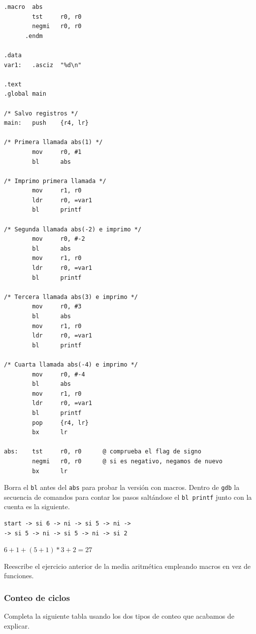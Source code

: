 \begin{lstlisting}[caption={Parte de subrut8.s},label={lst:codigoPract3_9}]
      .macro  abs
        tst     r0, r0
        negmi   r0, r0
      .endm

.data
var1:   .asciz  "%d\n"

.text
.global main

/* Salvo registros */
main:   push    {r4, lr}

/* Primera llamada abs(1) */
        mov     r0, #1
        bl      abs

/* Imprimo primera llamada */
        mov     r1, r0
        ldr     r0, =var1
        bl      printf

/* Segunda llamada abs(-2) e imprimo */
        mov     r0, #-2
        bl      abs
        mov     r1, r0
        ldr     r0, =var1
        bl      printf

/* Tercera llamada abs(3) e imprimo */
        mov     r0, #3
        bl      abs
        mov     r1, r0
        ldr     r0, =var1
        bl      printf

/* Cuarta llamada abs(-4) e imprimo */
        mov     r0, #-4
        bl      abs
        mov     r1, r0
        ldr     r0, =var1
        bl      printf
        pop     {r4, lr}
        bx      lr

abs:    tst     r0, r0      @ comprueba el flag de signo
        negmi   r0, r0      @ si es negativo, negamos de nuevo
        bx      lr
\end{lstlisting}

Borra el {\tt bl} antes del {\tt abs} para probar la versión con macros. Dentro de 
{\tt gdb} la secuencia de comandos para contar los pasos saltándose el
{\tt bl printf} junto con la cuenta es la siguiente.

\begin{lstlisting}
start -> si 6 -> ni -> si 5 -> ni -> 
-> si 5 -> ni -> si 5 -> ni -> si 2
\end{lstlisting}

$6+1+(5+1)*3+2 = 27$

\vspace{0.25cm}
Reescribe el ejercicio anterior de la media aritmética empleando macros en vez de
funciones.

\subsubsection{Conteo de ciclos}

Completa la siguiente tabla usando los dos tipos de conteo que acabamos de explicar.

